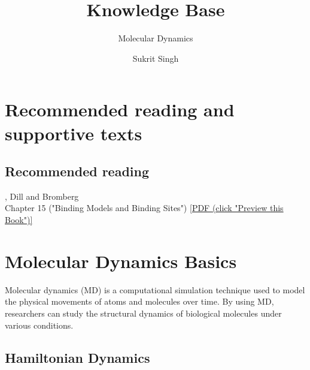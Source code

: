 \documentclass[english,course]{lecture}
\title{Knowledge Base}
\subtitle{Molecular Dynamics}
\author{Sukrit Singh}
\begin{document}
\vfill
\eject


\section{Recommended reading and supportive texts}

\subsection*{Recommended reading}

, Dill and Bromberg\\
Chapter 15 ("Binding Models and Binding Sites") \href{https://tinyurl.com/dill-bromberg-preview}{[PDF (click "Preview this Book")]}\\


\vfill
\eject


\section{Molecular Dynamics Basics}

Molecular dynamics (MD) is a computational simulation technique used to model the physical movements of atoms and molecules over time. By using MD, researchers can study the structural dynamics of biological molecules under various conditions.

\subsection{Hamiltonian Dynamics}
\end{document}
